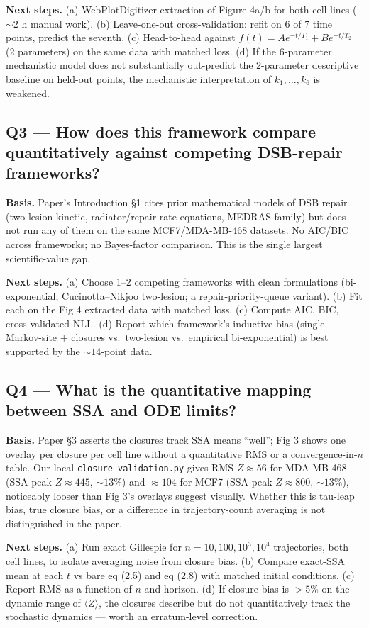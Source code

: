 \textbf{Next steps.} (a) WebPlotDigitizer extraction of Figure 4a/b for both cell lines
($\sim 2$ h manual work). (b) Leave-one-out cross-validation: refit on 6 of 7 time points,
predict the seventh. (c) Head-to-head against $f(t) = A e^{-t/T_1} + B e^{-t/T_2}$ (2
parameters) on the same data with matched loss. (d) If the 6-parameter mechanistic model does
not substantially out-predict the 2-parameter descriptive baseline on held-out points, the
mechanistic interpretation of $k_1,\ldots,k_6$ is weakened.

\subsection*{Q3 --- How does this framework compare quantitatively against competing DSB-repair frameworks?}

\textbf{Basis.} Paper's Introduction \S1 cites prior mathematical models of DSB repair (two-lesion
kinetic, radiator/repair rate-equations, MEDRAS family) but does not run any of them on the
same MCF7/MDA-MB-468 datasets. No AIC/BIC across frameworks; no Bayes-factor comparison. This
is the single largest scientific-value gap.

\textbf{Next steps.} (a) Choose 1--2 competing frameworks with clean formulations (bi-exponential;
Cucinotta--Nikjoo two-lesion; a repair-priority-queue variant). (b) Fit each on the Fig 4
extracted data with matched loss. (c) Compute AIC, BIC, cross-validated NLL. (d) Report which
framework's inductive bias (single-Markov-site $+$ closures vs.\ two-lesion vs.\ empirical
bi-exponential) is best supported by the $\sim 14$-point data.

\subsection*{Q4 --- What is the quantitative mapping between SSA and ODE limits?}

\textbf{Basis.} Paper \S3 asserts the closures track SSA means ``well''; Fig 3 shows one overlay per
closure per cell line without a quantitative RMS or a convergence-in-$n$ table. Our local
\texttt{closure\_validation.py} gives RMS $Z \approx 56$ for MDA-MB-468 (SSA peak
$Z \approx 445$, $\sim 13\%$) and $\approx 104$ for MCF7 (SSA peak $Z \approx 800$,
$\sim 13\%$), noticeably looser than Fig 3's overlays suggest visually. Whether this is
tau-leap bias, true closure bias, or a difference in trajectory-count averaging is not
distinguished in the paper.

\textbf{Next steps.} (a) Run exact Gillespie for $n = 10, 100, 10^3, 10^4$ trajectories, both cell
lines, to isolate averaging noise from closure bias. (b) Compare exact-SSA mean at each $t$ vs
bare eq (2.5) and eq (2.8) with matched initial conditions. (c) Report RMS as a function of
$n$ and horizon. (d) If closure bias is $>5\%$ on the dynamic range of $\langle Z\rangle$, the
closures describe but do not quantitatively track the stochastic dynamics --- worth an
erratum-level correction.


